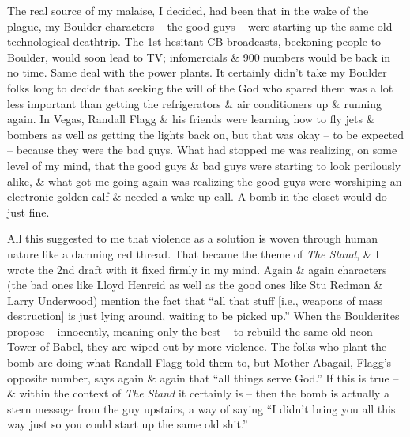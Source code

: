 \documentclass{article}
\numberwithin{equation}{section}
\begin{document}
The real source of my malaise, I decided, had been that in the wake of the plague, my Boulder characters -- the good guys -- were starting up the same old technological deathtrip. The 1st hesitant CB broadcasts, beckoning people to Boulder, would soon lead to TV; infomercials \& 900 numbers would be back in no time. Same deal with the power plants. It certainly didn't take my Boulder folks long to decide that seeking the will of the God who spared them was a lot less important than getting the refrigerators \& air conditioners up \& running again. In Vegas, Randall Flagg \& his friends were learning how to fly jets \& bombers as well as getting the lights back on, but that was okay -- to be expected -- because they were the bad guys. What had stopped me was realizing, on some level of my mind, that the good guys \& bad guys were starting to look perilously alike, \& what got me going again was realizing the good guys were worshiping an electronic golden calf \& needed a wake-up call. A bomb in the closet would do just fine.

All this suggested to me that violence as a solution is woven through human nature like a damning red thread. That became the theme of \textit{The Stand}, \& I wrote the 2nd draft with it fixed firmly in my mind. Again \& again characters (the bad ones like Lloyd Henreid as well as the good ones like Stu Redman \& Larry Underwood) mention the fact that ``all that stuff [i.e., weapons of mass destruction] is just lying around, waiting to be picked up.'' When the Boulderites propose -- innocently, meaning only the best -- to rebuild the same old neon Tower of Babel, they are wiped out by more violence. The folks who plant the bomb are doing what Randall Flagg told them to, but Mother Abagail, Flagg's opposite number, says again \& again that ``all things serve God.'' If this is true -- \& within the context of \textit{The Stand} it certainly is -- then the bomb is actually a stern message from the guy upstairs, a way of saying ``I didn't bring you all this way just so you could start up the same old shit.''
\end{document}
